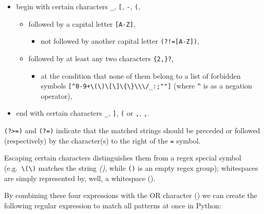 \documentclass[11pt]{article}
\begin{document}
\begin{itemize}

\item begin with certain characters \texttt{\_}, \texttt{{[}},
\texttt{-}, \texttt{(}, 

\begin{itemize}
\item followed by a capital letter \texttt{{[}A-Z{]}},
\begin{itemize}
\item not followed by another capital letter \texttt{(?!={[}A-Z{]})}, 
\end{itemize}
\end{itemize}

\begin{itemize}
\item followed by at least any two characters \texttt{\{2,\}?},
\begin{itemize}
\item at the condition that none of them belong to a list
of forbidden symbols
\texttt{{[}\^{}0-9+\textbackslash{}(\textbackslash{})\textbackslash{}{[}\textbackslash{}{]}\textbackslash{}\{\textbackslash{}\}\textbackslash{}\textbackslash{}\textbackslash{}/\_:;""{]}}
(where \texttt{\^{}} is as a negation operator),
\end{itemize}
\end{itemize}

\item end with certain
characters \texttt{\_}, \texttt{{]}}, \texttt{(} or \texttt{,},
\texttt{,}.

\end{itemize}

\texttt{(?\textgreater{}=)} and \texttt{(?=)} indicate that the matched
strings should be preceded or followed (respectively) by the
character(s) to the right of the \texttt{=} symbol.

Escaping certain characters distinguishes them from a regex special
symbol (e.g.~\texttt{\textbackslash{}(\textbackslash{})} matches the
string \emph{()}, while \texttt{()} is an empty regex group);
whitespaces are simply represented by, well, a whitespace (\texttt{}).

By combining these four expressions with the OR character
(\texttt{\textbar{}}) we can create the following regular expression to
match all patterns at once in Python:
\end{document}
